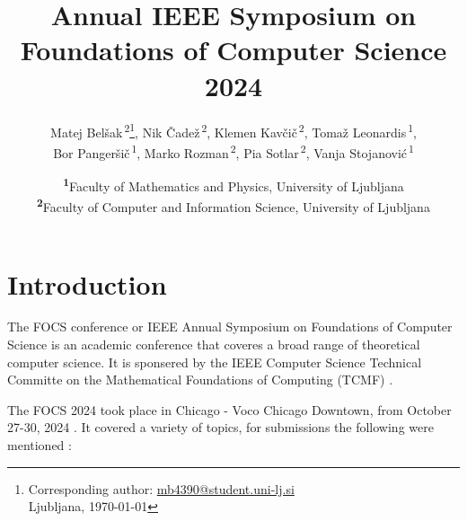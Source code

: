\documentclass[
	a4paper, %
	10pt, %
	unnumberedsections, %
	twoside, %
]{LTJournalArticle}
\title{Annual IEEE Symposium on Foundations of Computer Science 2024} %
\author{%
	Matej Bel\v sak\textsuperscript{\,2}\thanks{Corresponding author: \href{mailto:mb4390@student.uni-lj.si}{mb4390@student.uni-lj.si}\\ Ljubljana, \monthyeardate\today  }, 
	Nik \v Cade\v z\textsuperscript{\,2},
	Klemen Kav\v ci\v c\textsuperscript{\,2}, 
	Toma\v z Leonardis\textsuperscript{\,1},\\
	Bor Panger\v si\v c\textsuperscript{\,1}, 
	Marko Rozman\textsuperscript{\,2}, 
	Pia Sotlar\textsuperscript{\,2}, 
	Vanja Stojanovi\' c\textsuperscript{\,1}
}
\date{
	\footnotesize\textsuperscript{\textbf{1}}Faculty of Mathematics and Physics, University of Ljubljana\\
	\textsuperscript{\textbf{2}}Faculty of Computer and Information Science, University of Ljubljana
}
\theoremstyle{remark}
\begin{document}
\maketitle %


\section{Introduction}

The FOCS conference or IEEE Annual Symposium on Foundations of Computer Science is an academic conference that coveres
a broad range of theoretical computer science. It is sponsered by the IEEE Computer Science Technical Committe on the 
Mathematical Foundations of Computing (TCMF) \cite{ieeefocs}.

The FOCS 2024 took place in Chicago - Voco Chicago Downtown, from October 27-30, 2024 \cite{focs2024}. It covered a variety of topics, for submissions
the following were mentioned \cite{focs2024}:
\end{document}
